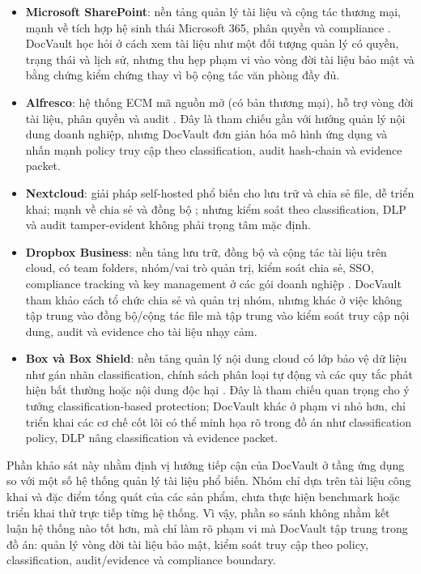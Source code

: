 \begin{itemize}
  \item \textbf{Microsoft SharePoint}: nền tảng quản lý tài liệu và cộng tác thương mại, mạnh về tích hợp hệ sinh thái Microsoft 365, phân quyền và compliance \cite{microsoft_sharepoint_intro}. DocVault học hỏi ở cách xem tài liệu như một đối tượng quản lý có quyền, trạng thái và lịch sử, nhưng thu hẹp phạm vi vào vòng đời tài liệu bảo mật và bằng chứng kiểm chứng thay vì bộ cộng tác văn phòng đầy đủ.
  \item \textbf{Alfresco}: hệ thống ECM mã nguồn mở (có bản thương mại), hỗ trợ vòng đời tài liệu, phân quyền và audit \cite{alfresco_security_authz,alfresco_audit}. Đây là tham chiếu gần với hướng quản lý nội dung doanh nghiệp, nhưng DocVault đơn giản hóa mô hình ứng dụng và nhấn mạnh policy truy cập theo classification, audit hash-chain và evidence packet.
  \item \textbf{Nextcloud}: giải pháp self-hosted phổ biến cho lưu trữ và chia sẻ file, dễ triển khai; mạnh về chia sẻ và đồng bộ \cite{nextcloud_files}; nhưng kiểm soát theo classification, DLP và audit tamper-evident không phải trọng tâm mặc định.
  \item \textbf{Dropbox Business}: nền tảng lưu trữ, đồng bộ và cộng tác tài liệu trên cloud, có team folders, nhóm/vai trò quản trị, kiểm soát chia sẻ, SSO, compliance tracking và key management ở các gói doanh nghiệp \cite{dropbox_business,dropbox_security}. DocVault tham khảo cách tổ chức chia sẻ và quản trị nhóm, nhưng khác ở việc không tập trung vào đồng bộ/cộng tác file mà tập trung vào kiểm soát truy cập nội dung, audit và evidence cho tài liệu nhạy cảm.
  \item \textbf{Box và Box Shield}: nền tảng quản lý nội dung cloud có lớp bảo vệ dữ liệu như gán nhãn classification, chính sách phân loại tự động và các quy tắc phát hiện bất thường hoặc nội dung độc hại \cite{box_security_classification,box_auto_classification,box_anomalous_download,box_malicious_content}. Đây là tham chiếu quan trọng cho ý tưởng classification-based protection; DocVault khác ở phạm vi nhỏ hơn, chỉ triển khai các cơ chế cốt lõi có thể minh họa rõ trong đồ án như classification policy, DLP nâng classification và evidence packet.
\end{itemize}

Phần khảo sát này nhằm định vị hướng tiếp cận của DocVault ở tầng ứng dụng so với một số hệ thống quản lý tài liệu phổ biến. Nhóm chỉ dựa trên tài liệu công khai và đặc điểm tổng quát của các sản phẩm, chưa thực hiện benchmark hoặc triển khai thử trực tiếp từng hệ thống. Vì vậy, phần so sánh không nhằm kết luận hệ thống nào tốt hơn, mà chỉ làm rõ phạm vi mà DocVault tập trung trong đồ án: quản lý vòng đời tài liệu bảo mật, kiểm soát truy cập theo policy, classification, audit/evidence và compliance boundary.

